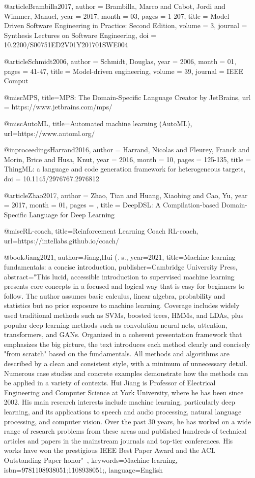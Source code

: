 @article{Brambilla2017,
author = {Brambilla, Marco and Cabot, Jordi and Wimmer, Manuel},
year = {2017},
month = {03},
pages = {1-207},
title = {Model-Driven Software Engineering in Practice: Second Edition},
volume = {3},
journal = {Synthesis Lectures on Software Engineering},
doi = {10.2200/S00751ED2V01Y201701SWE004}
}

@article{Schmidt2006,
author = {Schmidt, Douglas},
year = {2006},
month = {01},
pages = {41-47},
title = {Model-driven engineering},
volume = {39},
journal = {IEEE Comput}
}

@misc{MPS,
title={MPS: The Domain-Specific Language Creator by JetBrains},
url = {https://www.jetbrains.com/mps/}
}

@misc{AutoML,
title={Automated machine learning (AutoML)},
url={https://www.automl.org/}
}

@inproceedings{Harrand2016,
author = {Harrand, Nicolas and Fleurey, Franck and Morin, Brice and Husa, Knut},
year = {2016},
month = {10},
pages = {125-135},
title = {ThingML: a language and code generation framework for heterogeneous targets},
doi = {10.1145/2976767.2976812}
}

@article{Zhao2017,
author = {Zhao, Tian and Huang, Xiaobing and Cao, Yu},
year = {2017},
month = {01},
pages = {},
title = {DeepDSL: A Compilation-based Domain-Specific Language for Deep Learning}
}

@misc{RL-coach,
title={Reinforcement Learning Coach RL-coach},
url={https://intellabs.github.io/coach/}
}

@book{Jiang2021,
author={Jiang,Hui (. s.},
year={2021},
title={Machine learning fundamentals: a concise introduction},
publisher={Cambridge University Press},
abstract={"This lucid, accessible introduction to supervised machine learning presents core concepts in a focused and logical way that is easy for beginners to follow. The author assumes basic calculus, linear algebra, probability and statistics but no prior exposure to machine learning. Coverage includes widely used traditional methods such as SVMs, boosted trees, HMMs, and LDAs, plus popular deep learning methods such as convolution neural nets, attention, transformers, and GANs. Organized in a coherent presentation framework that emphasizes the big picture, the text introduces each method clearly and concisely "from scratch" based on the fundamentals. All methods and algorithms are described by a clean and consistent style, with a minimum of unnecessary detail. Numerous case studies and concrete examples demonstrate how the methods can be applied in a variety of contexts. Hui Jiang is Professor of Electrical Engineering and Computer Science at York University, where he has been since 2002. His main research interests include machine learning, particularly deep learning, and its applications to speech and audio processing, natural language processing, and computer vision. Over the past 30 years, he has worked on a wide range of research problems from these areas and published hundreds of technical articles and papers in the mainstream journals and top-tier conferences. His works have won the prestigious IEEE Best Paper Award and the ACL Outstanding Paper honor"--},
keywords={Machine learning},
isbn={9781108938051;1108938051;},
language={English}
}

